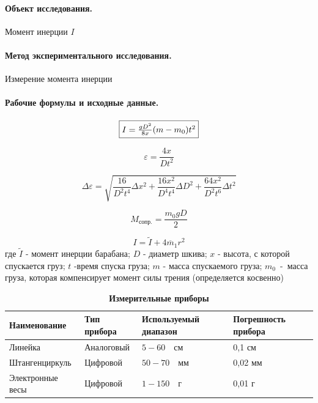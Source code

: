 \documentclass{article}
\begin{document}
\paragraph{Объект исследования.}
Момент инерции $I$

\paragraph{Метод экспериментального исследования.}
Измерение момента инерции

 \paragraph{Рабочие формулы и исходные данные.}\hypertarget{formuls}{}
 \begin{equation}
 	\fbox{$I=\frac{g D^2}{8x}(m-m_0)t^2$}
 \end{equation}

\begin{equation}
	\varepsilon=\frac{4x}{Dt^2}
\end{equation}

\begin{equation}
	\Delta \varepsilon=\sqrt{\frac{16}{D^2t^4}\Delta x^2+\frac{16x^2}{D^4t^4}\Delta D^2+\frac{64x^2}{D^2t^6}\Delta t^2}
\end{equation}

\begin{equation}
	M_{\mbox{сопр.}}=\frac{m_0gD}{2}
\end{equation}

\begin{equation}
	I=\tilde{I}+4\overline{m}_1r^2
\end{equation}
где $\tilde{I}$ - момент инерции барабана; $D$ - диаметр шкива; $x$ - высота, с которой спускается груз; $ t $ -время спуска груза; $m$ - масса спускаемого груза; $m_0$~-~масса груза, которая компенсирует момент силы трения (определяется косвенно)



\begin{table}[h]
	\caption{\bf Измерительные приборы}
	\begin{tabular}[c]{|p{7.5em}|p{7.5em}|p{7.5em}| p{7.5em}|}
		\hline
		Наименование & Тип прибора & Используемый диапазон & Погрешность прибора\\\hline
		Линейка & Аналоговый & $5 - 60\quad\mbox{см}$ & 0,1 см\\
		\hline
		Штангенциркуль& Цифровой&$50-70\quad\mbox{мм}$&0,02 мм\\
		\hline
		Электронные весы& Цифровой & $1 - 150\quad\mbox{г}$ & 0,01 г \\
		\hline
	\end{tabular}
\end{table}
\end{document}
